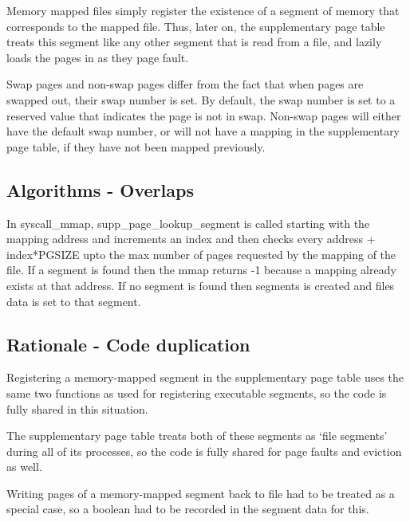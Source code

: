 Memory mapped files simply register the existence of a segment of memory that
corresponds to the mapped file. Thus, later on, the supplementary page table treats
this segment like any other segment that is read from a file, and lazily loads
the pages in as they page fault.

Swap pages and non-swap pages differ from the fact that when pages are swapped
out, their swap number is set. By default, the swap number is set to a reserved
value that indicates the page is not in swap. Non-swap pages will either have
the default swap number, or will not have a mapping in the supplementary page
table, if they have not been mapped previously.

\subsection{Algorithms - Overlaps}


In syscall\_mmap, supp\_page\_lookup\_segment is called starting with the mapping address and increments an index and then checks every address + index*PGSIZE upto the max number of pages requested by the mapping of the file. If a segment is found then the mmap returns -1 because a mapping already exists at that address. If no segment is found then segments is created and files data is set to that segment.

\subsection{Rationale - Code duplication}


Registering a memory-mapped segment in the supplementary page table uses the
same two functions as used for registering executable segments, so the code is
fully shared in this situation.

The supplementary page table treats both of these segments as `file segments'
during all of its processes, so the code is fully shared for page faults and
eviction as well.

Writing pages of a memory-mapped segment back to file had to be treated as a
special case, so a boolean had to be recorded in the segment data for this.